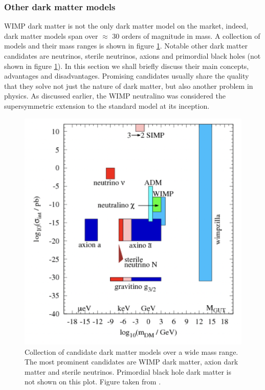 \subsubsection{Other dark matter models}\label{IntroOtherDM}
WIMP dark matter is not the only dark matter model on the market, indeed, dark matter models span over $\approx$ 30 orders of magnitude in mass. A collection of models and their mass ranges is shown in figure \ref{fig:DarkMatterModelsSummary}. Notable other dark matter candidates are neutrinos, sterile neutrinos, axions and primordial black holes (not shown in figure \ref{fig:DarkMatterModelsSummary}). In this section we shall briefly discuss their main concepts, advantages and disadvantages. Promising candidates usually share the quality that they solve not just the nature of dark matter, but also another problem in physics. As discussed earlier, the WIMP neutralino was considered the supersymmetric extension to the standard model at its inception.\\

\begin{figure}[bthp]
    \centering
    \includegraphics[width=\textwidth]{figures/DM_summary_models.png}
    \caption{Collection of candidate dark matter models over a wide mass range. The most prominent candidates are WIMP dark matter, axion dark matter and sterile neutrinos. Primordial black hole dark matter is not shown on this plot. Figure taken from \cite{BAER20151}.}
    \label{fig:DarkMatterModelsSummary}
\end{figure}


